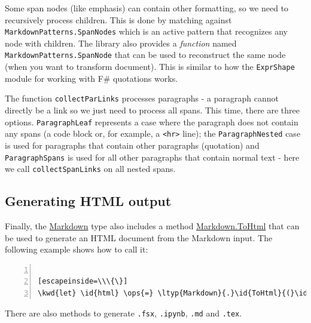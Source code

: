 \documentclass{article}
\newcommand{\id}[1]{\textcolor{black}{#1}}
\newcommand{\kwd}[1]{\textcolor{navy}{#1}}
\newcommand{\ops}[1]{\textcolor{purple}{#1}}
\begin{document}
Some span nodes (like emphasis) can contain other formatting, so we need to recursively
process children. This is done by matching against \texttt{MarkdownPatterns.SpanNodes} which is an active
pattern that recognizes any node with children. The library also provides a \emph{function}
named \texttt{MarkdownPatterns.SpanNode} that can be used to reconstruct the same node (when you want
to transform document). This is similar to how the \texttt{ExprShape} module for working with
F\# quotations works.


The function \texttt{collectParLinks} processes paragraphs - a paragraph cannot directly be a
link so we just need to process all spans. This time, there are three options.
\texttt{ParagraphLeaf} represents a case where the paragraph does not contain any spans
(a code block or, for example, a \texttt{<hr>} line); the \texttt{ParagraphNested} case is used for paragraphs
that contain other paragraphs (quotation) and \texttt{ParagraphSpans} is used for all other
paragraphs that contain normal text - here we call \texttt{collectSpanLinks} on all nested spans.
\subsection*{Generating HTML output}



Finally, the \href{https://fsprojects.github.io/FSharp.Formatting/reference/fsharp-formatting-markdown-markdown.html}{Markdown} type also includes a method \href{https://fsprojects.github.io/FSharp.Formatting/reference/fsharp-formatting-markdown-markdown.html}{Markdown.ToHtml} that can be used
to generate an HTML document from the Markdown input. The following example shows how to call it:
\begin{lstlisting}[numbers=left]

[escapeinside=\\\{\}]
\kwd{let} \id{html} \ops{=} \ltyp{Markdown}{.}\id{ToHtml}{(}\id{parsed}{)}

\end{lstlisting}



There are also methods to generate \texttt{.fsx}, \texttt{.ipynb}, \texttt{.md} and \texttt{.tex}.
\end{document}

